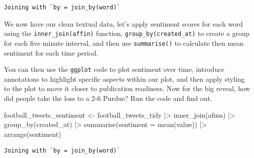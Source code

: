 \documentclass[
  letterpaper,
  DIV=11,
  numbers=noendperiod]{scrreprt}
\newenvironment{Shaded}{\begin{snugshade}}{\end{snugshade}}
\newcommand{\AttributeTok}[1]{\textcolor[rgb]{0.40,0.45,0.13}{#1}}
\newcommand{\FunctionTok}[1]{\textcolor[rgb]{0.28,0.35,0.67}{#1}}
\newcommand{\NormalTok}[1]{\textcolor[rgb]{0.00,0.23,0.31}{#1}}
\newcommand{\OtherTok}[1]{\textcolor[rgb]{0.00,0.23,0.31}{#1}}
\newcommand{\SpecialCharTok}[1]{\textcolor[rgb]{0.37,0.37,0.37}{#1}}
\begin{document}
\begin{verbatim}
Joining with `by = join_by(word)`
\end{verbatim}

We now have our clean textual data, let's apply sentiment scores for
each word using the \texttt{inner\_join(affin)} function,
\texttt{group\_by(created\_at)} to create a group for each five minute
interval, and then use \texttt{summarise()} to calculate then mean
sentiment for each time period.

You can then use the \texttt{ggplot} code to plot sentiment over time,
introduce annotations to highlight specific aspects within our plot, and
then apply styling to the plot to move it closer to publication
readiness. Now for the big reveal, how did people take the loss to a 2-6
Purdue? Run the code and find out.

\begin{Shaded}
\begin{Highlighting}[]
\NormalTok{football\_tweets\_sentiment }\OtherTok{\textless{}{-}}\NormalTok{ football\_tweets\_tidy }\SpecialCharTok{|\textgreater{}}
  \FunctionTok{inner\_join}\NormalTok{(afinn) }\SpecialCharTok{|\textgreater{}} 
  \FunctionTok{group\_by}\NormalTok{(created\_at) }\SpecialCharTok{|\textgreater{}} 
  \FunctionTok{summarise}\NormalTok{(}\AttributeTok{sentiment =} \FunctionTok{mean}\NormalTok{(value)) }\SpecialCharTok{|\textgreater{}} 
  \FunctionTok{arrange}\NormalTok{(sentiment)}
\end{Highlighting}
\end{Shaded}

\begin{verbatim}
Joining with `by = join_by(word)`
\end{verbatim}
\end{document}
